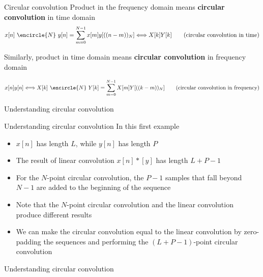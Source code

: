 \documentclass[10pt, aspectratio=169]{beamer}
\begin{document}
%
\begin{frame}{Circular convolution}
	Product in the frequency domain means \textbf{circular convolution} in time domain
	\begin{equation*}
		x[n]~\encircle{N}~y[n] = \sum_{m=0}^{N-1} x[m]y[((n-m))_N] \Longleftrightarrow X[k]Y[k] \tag{circular convolution in time}
	\end{equation*}
	
	Similarly, product in time domain means \textbf{circular convolution} in frequency domain
	
	\begin{equation*}
	x[n]y[n] \Longleftrightarrow X[k]~\encircle{N}~Y[k] = \sum_{m=0}^{N-1} X[m]Y[((k-m))_N] \tag{circular convolution in frequency}
	\end{equation*}
\end{frame}

%
\begin{frame}{Understanding circular convolution}
	\begin{center}
		\resizebox{0.5\textwidth}{!}{}
	\end{center}
\end{frame}

\begin{frame}{Understanding circular convolution}
In this first example
\begin{itemize}
	\item $x[n]$ has length $L$, while $y[n]$ has length $P$
	\item The result of linear convolution $x[n]\ast [y]$ has length $L+P-1$
	\item For the $N$-point circular convolution, the {\color{blue2} $P-1$ samples that fall beyond $N-1$} are added to the beginning of the sequence
	\item Note that the $N$-point circular convolution and the linear convolution produce different results
	\item We can make the circular convolution equal to the linear convolution by zero-padding the sequences and performing the $(L+P-1)$-point circular convolution
\end{itemize}
\end{frame}

%
\begin{frame}{Understanding circular convolution}
\begin{center}
	\resizebox{0.5\textwidth}{!}{}
\end{center}
\end{frame}
\end{document}
